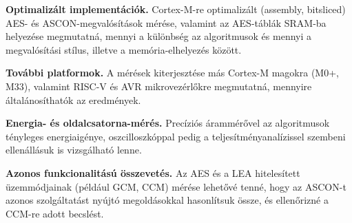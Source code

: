 \documentclass[a4paper,12pt]{report}
\theoremstyle{definition}
\theoremstyle{remark}
\begin{document}
\textbf{Optimalizált implementációk.} Cortex-M-re optimalizált (assembly, bitsliced) AES- és ASCON-megvalósítások mérése, valamint az AES-táblák SRAM-ba helyezése megmutatná, mennyi a különbség az algoritmusok és mennyi a megvalósítási stílus, illetve a memória-elhelyezés között.

\textbf{További platformok.} A mérések kiterjesztése más Cortex-M magokra (M0+, M33), valamint RISC-V és AVR mikrovezérlőkre megmutatná, mennyire általánosíthatók az eredmények.

\textbf{Energia- és oldalcsatorna-mérés.} Precíziós árammérővel az algoritmusok tényleges energiaigénye, oszcilloszkóppal pedig a teljesítményanalízissel szembeni ellenállásuk is vizsgálható lenne.

\textbf{Azonos funkcionalitású összevetés.} Az AES és a LEA hitelesített üzemmódjainak (például GCM, CCM) mérése lehetővé tenné, hogy az ASCON-t azonos szolgáltatást nyújtó megoldásokkal hasonlítsuk össze, és ellenőrizné a CCM-re adott becslést.
\end{document}
